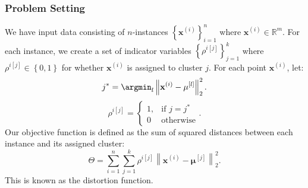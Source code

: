 \subsubsection{Problem Setting}
We have input data consisting of $n$-instances $ {\left\{ \mathbf{x}^{(i)}
\right\}}^{n}_{i=1}$ where $\mathbf{x}^{(i)}\in \mathbb{R}^{m}$.
For each instance, we create a set of indicator variables ${\left\{ \rho^{i[j]}
\right\}}^{k}_{j=1}$ where $\rho^{i[j]}\in \left\{ 0,1 \right\}$ for whether
$\mathbf{x}^{(i)}$ is assigned to cluster $j$. For each point
$\mathbf{x}^{(i)}$, let:
\[j^{*}=\argmin_l\left\lVert \mathbf{x}^{(i)}-\mathbf{\mu}^{[l]} \right\rVert_2^2.\] 
\[\rho^{i[j]}=\begin{cases}
  1,&\text{if }j=j^{*}\\
  0&\text{otherwise}
\end{cases}.\] 
Our objective function is defined as the sum of squared distances between each
instance and its assigned cluster:
\[\Theta=\sum_{i=1}^{n} \sum_{j=1}^{k} \rho^{i[j]}\left\lVert \mathbf{x}^{(i)}-\mathbf{\mu}^{[j]} \right\rVert_2^2.\]
This is known as the distortion function.
